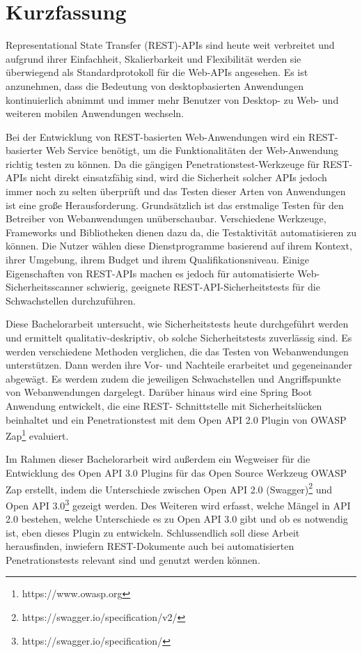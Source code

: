 \chapter{\textbf{Kurzfassung}}

Representational State Transfer (REST)-APIs sind heute weit verbreitet und aufgrund ihrer Einfachheit, Skalierbarkeit und Flexibilität werden sie überwiegend als Standardprotokoll für die Web-APIs angesehen. Es ist anzunehmen, dass die Bedeutung von desktopbasierten Anwendungen kontinuierlich abnimmt und immer mehr Benutzer von Desktop- zu Web- und weiteren mobilen Anwendungen wechseln.

Bei der Entwicklung von REST-basierten Web-Anwendungen wird ein REST-basierter Web Service benötigt, um die Funktionalitäten der Web-Anwendung richtig testen zu können. Da die gängigen Penetrationstest-Werkzeuge für REST-APIs nicht direkt einsatzfähig sind, wird die Sicherheit solcher APIs jedoch immer noch zu selten überprüft und das Testen dieser Arten von Anwendungen ist eine große Herausforderung. Grundsätzlich ist das erstmalige Testen für den Betreiber von Webanwendungen unüberschaubar. Verschiedene Werkzeuge, Frameworks und Bibliotheken dienen dazu da, die Testaktivität automatisieren zu können. Die Nutzer wählen diese Dienstprogramme basierend auf ihrem Kontext, ihrer Umgebung, ihrem Budget und ihrem Qualifikationsniveau. Einige Eigenschaften von REST-APIs machen es jedoch für automatisierte Web-Sicherheitsscanner schwierig, geeignete REST-API-Sicherheitstests für die Schwachstellen durchzuführen.

Diese Bachelorarbeit untersucht, wie Sicherheitstests heute durchgeführt werden und ermittelt qualitativ-deskriptiv, ob solche Sicherheitstests zuverlässig sind. Es werden verschiedene Methoden verglichen, die das Testen von Webanwendungen unterstützen. Dann werden ihre Vor- und Nachteile erarbeitet und gegeneinander abgewägt. Es werdem zudem die jeweiligen Schwachstellen und Angriffspunkte von Webanwendungen dargelegt.
Darüber hinaus wird eine Spring Boot Anwendung entwickelt, die eine REST- Schnittstelle mit Sicherheitslücken beinhaltet und ein Penetrationstest mit dem Open API 2.0 Plugin von OWASP Zap\footnote{https://www.owasp.org} evaluiert.

Im Rahmen dieser Bachelorarbeit wird außerdem ein Wegweiser für die Entwicklung des Open API 3.0 Plugins für das Open Source Werkzeug OWASP Zap erstellt, indem die Unterschiede zwischen Open API 2.0 (Swagger)\footnote{https://swagger.io/specification/v2/} und Open API 3.0\footnote{https://swagger.io/specification/} gezeigt werden. Des Weiteren wird erfasst, welche Mängel in API 2.0 bestehen, welche Unterschiede es zu Open API 3.0 gibt und ob es notwendig ist, eben dieses Plugin zu entwickeln. Schlussendlich soll diese Arbeit herausfinden, inwiefern REST-Dokumente auch bei automatisierten Penetrationstests relevant sind und genutzt werden können.
